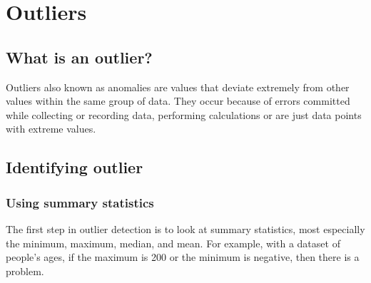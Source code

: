 \documentclass[
]{book}
\begin{document}
\hypertarget{outliers}{%
\section{Outliers}\label{outliers}}

\hypertarget{what-is-an-outlier-1}{%
\subsection{What is an outlier?}\label{what-is-an-outlier-1}}

Outliers also known as anomalies are values that deviate extremely from other values within the same group of data. They occur because of errors committed while collecting or recording data, performing calculations or are just data points with extreme values.

\hypertarget{identifying-outlier-1}{%
\subsection{Identifying outlier}\label{identifying-outlier-1}}

\hypertarget{using-summary-statistics-1}{%
\subsubsection{Using summary statistics}\label{using-summary-statistics-1}}

The first step in outlier detection is to look at summary statistics, most especially the minimum, maximum, median, and mean. For example, with a dataset of people's ages, if the maximum is 200 or the minimum is negative, then there is a problem.
\end{document}
